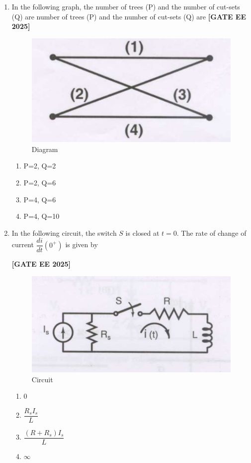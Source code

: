 \documentclass[12pt]{article}
\begin{document}
\begin{enumerate}[leftmargin=2.5em, label=\textbf{Q.\arabic*}., itemsep=2em]
\item In the following graph, the number of trees (P) and the number of cut-sets (Q) are
number of trees (P) and the number of cut-sets (Q) are
\noindent \textbf{[GATE EE 2025]}
\begin{figure}[H]\centering
\includegraphics[width=0.5\columnwidth]{figs/q7.png}
\caption{Diagram}
\label{fig:q7}
\end{figure}
\begin{multicols}{4}
    \begin{enumerate}
        \item P=2, Q=2
        \item P=2, Q=6
        \item P=4, Q=6
        \item P=4, Q=10
    \end{enumerate}
\end{multicols}

\item In the following circuit, the switch $S$ is closed at $t = 0$. The rate of change of current $\dfrac{di}{dt}(0^+)$ is given by
 
\noindent \textbf{[GATE EE 2025]}
\begin{figure}[H]\centering
\includegraphics[width=0.5\columnwidth]{figs/q8.png}
\caption{Circuit}
\label{fig:q8}
\end{figure}
\begin{multicols}{4}
\begin{enumerate}
    \item 0
    \item $\dfrac{R_s I_s}{L}$
    \item $\dfrac{(R+R_s) I_s}{L}$
    \item $\infty$
\end{enumerate}
\end{multicols}


\end{enumerate}
\end{document}

